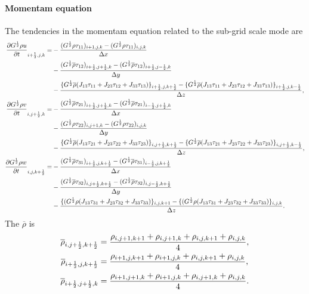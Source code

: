\paragraph{Momentam equation}
The tendencies in the momentam equation related to the sub-grid scale mode are
\begin{align}
  \frac{\partial G^{\frac{1}{2}}\rho u}{\partial t}_{i+\half,j,k} =
  &-\frac{(G^{\frac{1}{2}}\rho\tau_{11})_{i+1,j,k}-(G^{\frac{1}{2}}\rho\tau_{11})_{i,j,k}}{\Delta x} \nonumber \\
  &- \frac{(G^{\frac{1}{2}}\overline{\rho}\tau_{12})_{i+\half,j+\half,k}-(G^{\frac{1}{2}}\overline{\rho}\tau_{12})_{i+\half,j-\half,k}}{\Delta y} \nonumber \\
  &- \frac{\{G^{\frac{1}{2}}\overline{\rho}(J_{13}\tau_{11}+J_{23}\tau_{12}+J_{33}\tau_{13})\}_{i+\half,j,k+\half}
          -\{G^{\frac{1}{2}}\overline{\rho}(J_{13}\tau_{11}+J_{23}\tau_{12}+J_{33}\tau_{13})\}_{i+\half,j,k-\half}}{\Delta z}, \\
  \frac{\partial G^{\frac{1}{2}}\rho v}{\partial t}_{i,j+\half,k} =
  &- \frac{(G^{\frac{1}{2}}\overline{\rho}\tau_{21})_{i+\half,j+\half,k}-(G^{\frac{1}{2}}\overline{\rho}\tau_{21})_{i-\half,j+\half,k}}{\Delta x} \nonumber \\
  &- \frac{(G^{\frac{1}{2}}\rho\tau_{22})_{i,j+1,k}-(G^{\frac{1}{2}}\rho\tau_{22})_{i,j,k}}{\Delta y} \nonumber \\
  &- \frac{\{G^{\frac{1}{2}}\overline{\rho}(J_{13}\tau_{21}+J_{23}\tau_{22}+J_{33}\tau_{23})\}_{i,j+\half,k+\half}
          -\{G^{\frac{1}{2}}\overline{\rho}(J_{13}\tau_{21}+J_{23}\tau_{22}+J_{33}\tau_{23})\}_{i,j+\half,k-\half}}{\Delta z}, \\
  \frac{\partial G^{\frac{1}{2}}\rho w}{\partial t}_{i,j,k+\half} =
  &- \frac{(G^{\frac{1}{2}}\overline{\rho}\tau_{31})_{i+\half,j,k+\half}-(G^{\frac{1}{2}}\overline{\rho}\tau_{31})_{i-\half,j,k+\half}}{\Delta x} \nonumber \\
  &- \frac{(G^{\frac{1}{2}}\overline{\rho}\tau_{32})_{i,j+\half,k+\half}-(G^{\frac{1}{2}}\overline{\rho}\tau_{32})_{i,j-\half,k+\half}}{\Delta y} \nonumber \\
  &- \frac{\{(G^{\frac{1}{2}}\rho(J_{13}\tau_{31}+J_{23}\tau_{32}+J_{33}\tau_{33})\}_{i,j,k+1}
          -\{(G^{\frac{1}{2}}\rho(J_{13}\tau_{31}+J_{23}\tau_{32}+J_{33}\tau_{33})\}_{i,j,k}}{\Delta z}.
\end{align}
The $\overline{\rho}$ is
\begin{align}
  \overline{\rho}_{i,j+\half,k+\half} &=
  \frac{\rho_{i,j+1,k+1} + \rho_{i,j+1,k} + \rho_{i,j,k+1} + \rho_{i,j,k}}{4}, \\
  \overline{\rho}_{i+\half,j,k+\half} &=
  \frac{\rho_{i+1,j,k+1} + \rho_{i+1,j,k} + \rho_{i,j,k+1} + \rho_{i,j,k}}{4}, \\
  \overline{\rho}_{i+\half,j+\half,k} &=
  \frac{\rho_{i+1,j+1,k} + \rho_{i+1,j,k} + \rho_{i,j+1,k} + \rho_{i,j,k}}{4}.
\end{align}

